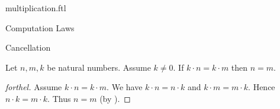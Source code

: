 \documentclass{naproche-library}
\begin{document}
\begin{smodule}[title=Multiplication]{multiplication.ftl}
\begin{sfragment}{Computation Laws}
\begin{sfragment}{Cancellation}
    \begin{corollary}[forthel,id=ARITHMETIC_06_8575191374364672]
      Let $n, m, k$ be natural numbers.
      Assume $k \neq 0$.
      If $k \cdot n = k \cdot m$ then $n = m$.
    \end{corollary}
    \begin{proof}[forthel]
      Assume $k \cdot n = k \cdot m$.
      We have $k \cdot n = n \cdot k$ and $k \cdot m = m \cdot k$.
      Hence $n \cdot k = m \cdot k$.
      Thus $n = m$ (by ).
    \end{proof}
  \end{sfragment}
\end{sfragment}
\end{smodule}
\end{document}
